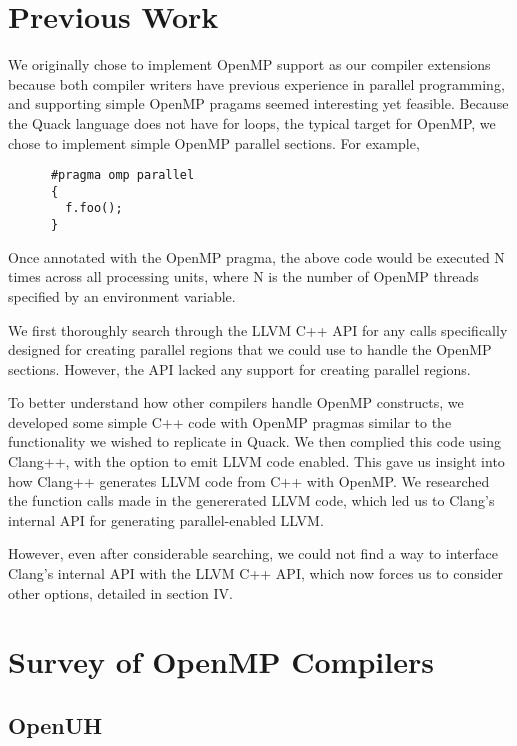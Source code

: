 \documentclass[11pt,journal]{IEEEtran}
\begin{document}
\section{Previous Work}

    We originally chose to implement OpenMP support as our compiler extensions because
    both compiler writers have previous experience in parallel programming, and
    supporting simple OpenMP pragams seemed interesting yet feasible. Because
    the Quack language does not have for loops, the typical target for OpenMP,
    we chose to implement simple OpenMP parallel sections. For example,

    \begin{verbatim}
      #pragma omp parallel
      {
        f.foo();
      } 
    \end{verbatim}
    Once annotated with the OpenMP pragma, the above code would be executed N times across    all processing units, where N is the number of OpenMP threads specified by an
    environment variable.

    We first thoroughly search through the LLVM C++ API for any calls specifically
    designed for creating parallel regions that we could use to handle the
    OpenMP sections. However, the API lacked any support for creating parallel
    regions.

    To better understand how other compilers handle OpenMP constructs, we developed
    some simple C++ code with OpenMP pragmas similar to the functionality we wished
    to replicate in Quack. We then complied this code using Clang++, with the option
    to emit LLVM code enabled. This gave us insight into how Clang++ generates
    LLVM code from C++ with OpenMP. We researched the function calls made in the
    genererated LLVM code, which led us to Clang's internal API for generating
    parallel-enabled LLVM.

    However, even after considerable searching, we could not find a way to interface
    Clang's internal API with the LLVM C++ API, which now forces us to consider
    other options, detailed in section IV.

\section{Survey of OpenMP Compilers}

\subsection{OpenUH}
\end{document}

